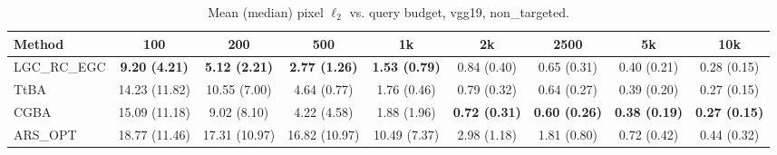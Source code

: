 \begin{table}[t]
\centering\footnotesize
\caption{Mean (median) pixel $\ell_2$ vs. query budget, vgg19, non\_targeted.}
\begin{tabular}{lcccccccc}
\toprule
Method & 100 & 200 & 500 & 1k & 2k & 2500 & 5k & 10k \\
\midrule
LGC\_RC\_EGC & \textbf{9.20 (4.21)} & \textbf{5.12 (2.21)} & \textbf{2.77 (1.26)} & \textbf{1.53 (0.79)} & 0.84 (0.40) & 0.65 (0.31) & 0.40 (0.21) & 0.28 (0.15) \\
TtBA & 14.23 (11.82) & 10.55 (7.00) & 4.64 (0.77) & 1.76 (0.46) & 0.79 (0.32) & 0.64 (0.27) & 0.39 (0.20) & 0.27 (0.15) \\
CGBA & 15.09 (11.18) & 9.02 (8.10) & 4.22 (4.58) & 1.88 (1.96) & \textbf{0.72 (0.31)} & \textbf{0.60 (0.26)} & \textbf{0.38 (0.19)} & \textbf{0.27 (0.15)} \\
ARS\_OPT & 18.77 (11.46) & 17.31 (10.97) & 16.82 (10.97) & 10.49 (7.37) & 2.98 (1.18) & 1.81 (0.80) & 0.72 (0.42) & 0.44 (0.32) \\
\bottomrule
\end{tabular}
\end{table}
